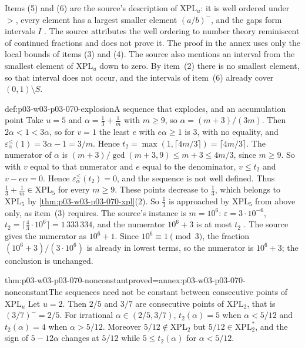 Items (5) and (6) are the source's description of \(\mathrm{XPL}_u\): it is
well ordered under \(>\), every element has a largest smaller element
\((a/b)^-\), and the gaps form intervals \(I\)
\cite[p.~19]{Spencer2007LogicRandomStructuresAuthor}.  The source attributes
the well ordering to number theory reminiscent of continued fractions and does
not prove it.  The proof in the annex uses only the local bounds of items (3)
and (4).  The source also mentions an interval from the smallest element of
\(\mathrm{XPL}_u\) down to zero.  By item~(2) there is no smallest element, so
that interval does not occur, and the intervals of item~(6) already cover
\((0,1)\setminus S\).

\begin{hbexample}{def:p03-w03-p03-070-explosion}{A sequence that explodes, and an accumulation point}
Take \(u=5\) and \(\alpha=\frac13+\frac1m\) with \(m\geq9\), so
\(\alpha=(m+3)/(3m)\).  Then \(2\alpha<1<3\alpha\), so for \(v=1\) the least
\(e\) with \(e\alpha\geq1\) is \(3\), with no equality, and
\(\varepsilon^{\leq}_\alpha(1)=3\alpha-1=3/m\).  Hence
\(t_2=\max(1,\lceil4m/3\rceil)=\lceil4m/3\rceil\).  The numerator of
\(\alpha\) is \((m+3)/\gcd(m+3,9)\leq m+3\leq4m/3\), since \(m\geq9\).  So
with \(v\) equal to that numerator and \(e\) equal to the denominator,
\(v\leq t_2\) and \(v-e\alpha=0\).  Hence
\(\varepsilon^{\leq}_\alpha(t_2)=0\), and the sequence is not well defined.
Thus \(\frac13+\frac1m\in\mathrm{XPL}_5\) for every \(m\geq9\).  These points
decrease to \(\frac13\), which belongs to \(\mathrm{XPL}_5\) by
\cref{thm:p03-w03-p03-070-xpl}(2).  So \(\frac13\) is approached by
\(\mathrm{XPL}_5\) from above only, as item~(3) requires.  The source's
instance is \(m=10^6\): \(\varepsilon=3\cdot10^{-6}\),
\(t_2=\lceil\frac43\cdot10^6\rceil=1\,333\,334\), and the numerator
\(10^6+3\) is at most \(t_2\)
\cite[pp.~18--19]{Spencer2007LogicRandomStructuresAuthor}.  The source
gives the numerator as \(10^6+1\).  Since \(10^6\equiv1\pmod3\), the
fraction \((10^6+3)/(3\cdot10^6)\) is already in lowest terms, so the
numerator is \(10^6+3\); the conclusion is unchanged.
\end{hbexample}

\begin{hbtheorem}{thm:p03-w03-p03-070-nonconstant}{proved=annex:p03-w03-p03-070-nonconstant}{The sequences need not be constant between consecutive points of \(\mathrm{XPL}_u\)}
Let \(u=2\).  Then \(2/5\) and \(3/7\) are consecutive points of
\(\mathrm{XPL}_2\), that is \((3/7)^-=2/5\).  For irrational
\(\alpha\in(2/5,3/7)\), \(t_2(\alpha)=5\) when \(\alpha<5/12\) and
\(t_2(\alpha)=4\) when \(\alpha>5/12\).  Moreover
\(5/12\notin\mathrm{XPL}_2\) but \(5/12\in\mathrm{XPL}^\ast_2\), and the sign
of \(5-12\alpha\) changes at \(5/12\) while \(5\leq t_2(\alpha)\) for
\(\alpha<5/12\).
\end{hbtheorem}

